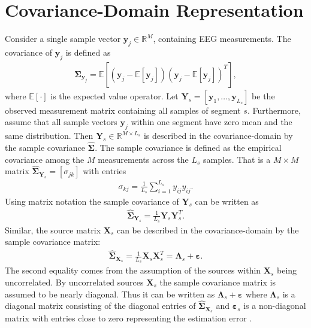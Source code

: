 \section{Covariance-Domain Representation}\label{sec:cov}
Consider a single sample vector $\textbf{y}_j\in \mathbb{R}^{M}$, containing EEG measurements. 
The covariance of $\mathbf{y}_j$ is defined as
\begin{align*}
\boldsymbol{\Sigma}_{\mathbf{y}_j} = \mathbb{E}[(\mathbf{y}_j - \mathbb{E}[\mathbf{y}_j]) (\mathbf{y}_j - \mathbb{E}[\mathbf{y}_j])^T],
\end{align*}
where $\mathbb{E}[\cdot]$ is the expected value operator. 
Let $\mathbf{Y}_{s} = \left[\mathbf{y}_1, \dots, \mathbf{y}_{L_s}\right]$ be the observed measurement matrix containing all samples of segment $s$.
Furthermore, assume that all sample vectors $\mathbf{y}_j$ within one segment have zero mean and the same distribution.  
Then $\mathbf{Y}_s \in \mathbb{R}^{M \times L_s}$ is described in the covariance-domain by the sample covariance $\widehat{\boldsymbol{\Sigma}}$. 
The sample covariance is defined as the empirical covariance among the $M$ measurements across the $L_s$ samples. 
That is a $M \times M$ matrix $\widehat{\boldsymbol{\Sigma}}_{\mathbf{Y}_s} = [\sigma_{jk}]$ with entries 
\begin{align*}
\sigma_{kj} = \frac{1}{L_s} \sum_{i=1}^{L_s} y_{ij} y_{ij}.
\end{align*}
Using matrix notation the sample covariance of $\mathbf{Y}_s$ can be written as
\begin{align*}
\widehat{\boldsymbol{\Sigma}}_{\mathbf{Y}_s} = \frac{1}{L_s} \mathbf{Y}_s \mathbf{Y}_s^T.
\end{align*} 
Similar, the source matrix $\mathbf{X}_s$ can be described in the covariance-domain by the sample covariance matrix:
\begin{align*}
\widehat{\boldsymbol{\Sigma}}_{\mathbf{X}_s} = \frac{1}{L_s} \mathbf{X}_s \mathbf{X}_s^T = \boldsymbol{\Lambda}_s + \boldsymbol{\varepsilon}. 
\end{align*}
The second equality comes from the assumption of the sources within $\mathbf{X}_s$ being uncorrelated. 
By uncorrelated sources $\mathbf{X}_s$ the sample covariance matrix is assumed to be nearly diagonal. 
Thus it can be written as $\boldsymbol{\Lambda}_s + \boldsymbol{\varepsilon}$ where $\boldsymbol{\Lambda}_s$ is a diagonal matrix consisting of the diagonal entries of $\widehat{\boldsymbol{\Sigma}}_{\mathbf{X}_s}$ and $ \boldsymbol{\varepsilon}_s$ is a non-diagonal matrix with entries close to zero representing the estimation error \cite{Balkan2015}.

